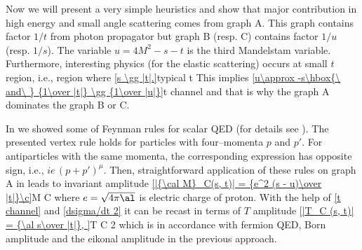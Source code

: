 
Now we will present a very simple heuristics and show that major contribution in high energy and small angle scattering comes from graph A. This graph contains factor $1/t$ from photon propagator but graph B (resp. C) contains factor $1/u$ (resp. $1/s$). The variable $u = 4M^2 - s - t$ is the third Mandelstam variable. Furthermore, interesting physics (for the elastic scattering) occurs at small $t$ region, i.e., region where
\eqref{s \gg |t|.}{typical t}
This implies
\eqref{u\approx -s\hbox{\ and\ } {1\over |t|} \gg {1\over |u|}}{t channel}
and that is why the graph A dominates the graph B or C.


In \fg{}  we showed some of Feynman rules for scalar QED (for details see \rf{} ). The presented vertex rule holds for particles with four--momenta $p$ and $p'$. For antiparticles with the same momenta, the corresponding expression has opposite sign, i.e., $ie\,(p + p')^\mu$. Then, straightforward application of these rules on graph A in \fg{}  leads to invariant amplitude
\eqref{|{\cal M}_C(s, t)| = {e^2 (s - u)\over |t|}\c}{M C}
where $e = \sqrt{4\pi\al}$ is electric charge of proton. With the help of \equs{} \ref{t channel} and \ref{dsigma/dt 2} it can be recast in terms of $T$ amplitude
\eqref{|T_C (s, t)| = {\al s\over |t|}, }{T C 2}
which is in accordance with fermion QED, Born amplitude and the eikonal amplitude in the previous approach.



